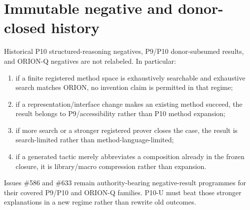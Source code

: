 \section{Immutable negative and donor-closed history}
Historical P10 structured-reasoning negatives, P9/P10 donor-subsumed results, and ORION-Q negatives are not relabeled. In particular:
\begin{enumerate}
    \item if a finite registered method space is exhaustively searchable and exhaustive search matches ORION, no invention claim is permitted in that regime;
    \item if a representation/interface change makes an existing method succeed, the result belongs to P9/accessibility rather than P10 method expansion;
    \item if more search or a stronger registered prover closes the case, the result is search-limited rather than method-language-limited;
    \item if a generated tactic merely abbreviates a composition already in the frozen closure, it is library/macro compression rather than expansion.
\end{enumerate}
Issues \#586 and \#633 remain authority-bearing negative-result programmes for their covered P9/P10 and ORION-Q families. P10-U must beat those stronger explanations in a new regime rather than rewrite old outcomes.

